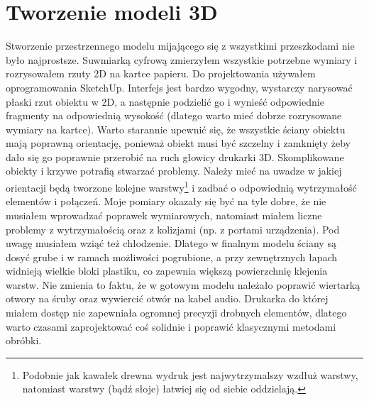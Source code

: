 \documentclass[declaration,shortabstract, inz]{iithesis}
\begin{document}
\section{Tworzenie modeli 3D}
\label{section:3d}
    Stworzenie przestrzennego modelu mijającego się z wszystkimi przeszkodami nie było najprostsze. Suwmiarką cyfrową zmierzyłem wszystkie potrzebne wymiary i rozrysowałem rzuty 2D na kartce papieru. Do projektowania używałem oprogramowania SketchUp. Interfejs jest bardzo wygodny, wystarczy narysować płaski rzut obiektu w 2D, a następnie podzielić go i wynieść odpowiednie fragmenty na odpowiednią wysokość (dlatego warto mieć dobrze rozrysowane wymiary na kartce). Warto starannie upewnić się, że wszystkie ściany obiektu mają poprawną orientację, ponieważ obiekt musi być szczelny i zamknięty żeby dało się go poprawnie przerobić na ruch głowicy drukarki 3D. Skomplikowane obiekty i krzywe potrafią stwarzać problemy. Należy mieć na uwadze w jakiej orientacji będą tworzone kolejne warstwy\footnote{Podobnie jak kawałek drewna wydruk jest najwytrzymalszy wzdłuż warstwy, natomiast warstwy (bądź słoje) łatwiej się od siebie oddzielają.} i zadbać o odpowiednią wytrzymałość elementów i połączeń. Moje pomiary okazały się być na tyle dobre, że nie musiałem wprowadzać poprawek wymiarowych, natomiast miałem liczne problemy z wytrzymałością oraz z kolizjami (np. z portami urządzenia). Pod uwagę musiałem wziąć też chłodzenie. Dlatego w finalnym modelu ściany są dosyć grube i w ramach możliwości pogrubione, a przy zewnętrznych łapach widnieją wielkie bloki plastiku, co zapewnia większą powierzchnię klejenia warstw. Nie zmienia to faktu, że w gotowym modelu należało poprawić wiertarką otwory na śruby oraz wywiercić otwór na kabel audio. Drukarka do której miałem dostęp nie zapewniała ogromnej precyzji drobnych elementów, dlatego warto czasami zaprojektować coś solidnie i poprawić klasycznymi metodami obróbki.
\end{document}
